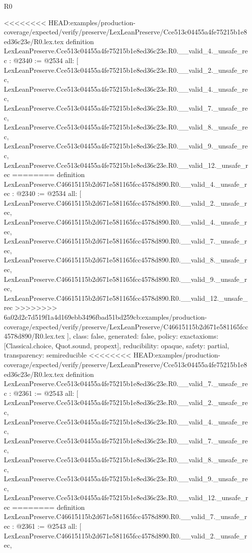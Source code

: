 \begin{lexlean}{R0}
\begin{coremodule}
{{{{{{{{{{{{{{{{{{{{{{{{{{{{{{{{{{{{{{{{{{{{{{{{{{{}
<<<<<<<< HEAD:examples/production-coverage/expected/verify/preserve/LexLeanPreserve/Cce513c04455a4fe75215b1e8ed36c23e/R0.lex.tex
definition LexLeanPreserve.Cce513c04455a4fe75215b1e8ed36c23e.R0.__valid_4._unsafe_rec : @2340 := @2534 {
  all: [
    LexLeanPreserve.Cce513c04455a4fe75215b1e8ed36c23e.R0.__valid_2._unsafe_rec,
    LexLeanPreserve.Cce513c04455a4fe75215b1e8ed36c23e.R0.__valid_4._unsafe_rec,
    LexLeanPreserve.Cce513c04455a4fe75215b1e8ed36c23e.R0.__valid_7._unsafe_rec,
    LexLeanPreserve.Cce513c04455a4fe75215b1e8ed36c23e.R0.__valid_8._unsafe_rec,
    LexLeanPreserve.Cce513c04455a4fe75215b1e8ed36c23e.R0.__valid_9._unsafe_rec,
    LexLeanPreserve.Cce513c04455a4fe75215b1e8ed36c23e.R0.__valid_12._unsafe_rec
========
definition LexLeanPreserve.C46615115b2d671e581165fcc4578d890.R0.__valid_4._unsafe_rec : @2340 := @2534 {
  all: [
    LexLeanPreserve.C46615115b2d671e581165fcc4578d890.R0.__valid_2._unsafe_rec,
    LexLeanPreserve.C46615115b2d671e581165fcc4578d890.R0.__valid_4._unsafe_rec,
    LexLeanPreserve.C46615115b2d671e581165fcc4578d890.R0.__valid_7._unsafe_rec,
    LexLeanPreserve.C46615115b2d671e581165fcc4578d890.R0.__valid_8._unsafe_rec,
    LexLeanPreserve.C46615115b2d671e581165fcc4578d890.R0.__valid_9._unsafe_rec,
    LexLeanPreserve.C46615115b2d671e581165fcc4578d890.R0.__valid_12._unsafe_rec
>>>>>>>> 6a02d2c7d519f1a4d169ebb3496fbad51bd259cb:examples/production-coverage/expected/verify/preserve/LexLeanPreserve/C46615115b2d671e581165fcc4578d890/R0.lex.tex
  ],
  class: false,
  generated: false,
  policy: exact{axioms: [Classical.choice, Quot.sound, propext]},
  reducibility: opaque{},
  safety: partial,
  transparency: semireducible
}
<<<<<<<< HEAD:examples/production-coverage/expected/verify/preserve/LexLeanPreserve/Cce513c04455a4fe75215b1e8ed36c23e/R0.lex.tex
definition LexLeanPreserve.Cce513c04455a4fe75215b1e8ed36c23e.R0.__valid_7._unsafe_rec : @2361 := @2543 {
  all: [
    LexLeanPreserve.Cce513c04455a4fe75215b1e8ed36c23e.R0.__valid_2._unsafe_rec,
    LexLeanPreserve.Cce513c04455a4fe75215b1e8ed36c23e.R0.__valid_4._unsafe_rec,
    LexLeanPreserve.Cce513c04455a4fe75215b1e8ed36c23e.R0.__valid_7._unsafe_rec,
    LexLeanPreserve.Cce513c04455a4fe75215b1e8ed36c23e.R0.__valid_8._unsafe_rec,
    LexLeanPreserve.Cce513c04455a4fe75215b1e8ed36c23e.R0.__valid_9._unsafe_rec,
    LexLeanPreserve.Cce513c04455a4fe75215b1e8ed36c23e.R0.__valid_12._unsafe_rec
========
definition LexLeanPreserve.C46615115b2d671e581165fcc4578d890.R0.__valid_7._unsafe_rec : @2361 := @2543 {
  all: [
    LexLeanPreserve.C46615115b2d671e581165fcc4578d890.R0.__valid_2._unsafe_rec,
}}}}}}}}}}}}}}}}}}}}}}}}}}}}}}}}}}}}}}}}}}}}}}}}}}}}}
\end{coremodule}
\end{lexlean}
